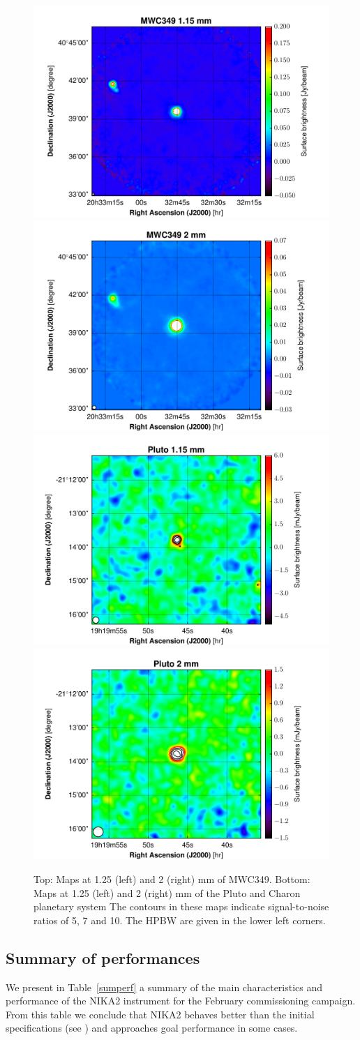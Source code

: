 \documentclass[]{aa} %
\begin{document}
\begin{figure}[h]
   \centering
   \includegraphics[width=.45\linewidth]{MWC349_1mm_map_snrcont.pdf}
    \includegraphics[width=.45\linewidth]{MWC349_2mm_map_snrcont.pdf} 
        \includegraphics[width=.45\linewidth]{Pluto_1mm_map_snrcont.pdf}
    \includegraphics[width=.45\linewidth]{Pluto_2mm_map_snrcont.pdf}
      \caption{Top: Maps at 1.25 (left) and 2 (right) mm of MWC349. Bottom: Maps at 1.25 (left) and 2 (right) mm of the Pluto and Charon planetary system The contours in these maps indicate signal-to-noise ratios of 5, 7 and 10. The HPBW are given in the lower left corners.
         \label{fig_compact_sources}}
\end{figure}


\subsection{Summary of performances}
We present in Table~\ref{sumperf} a summary of the main characteristics and performance of the NIKA2 instrument for the February commissioning campaign. 
From this table we conclude that NIKA2 behaves better than the initial specifications (see \cite{Calvo2016}) and approaches goal performance in some cases. 
\end{document}
